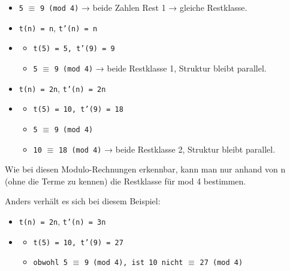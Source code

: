 \documentclass{article}
\begin{document}
      \begin{itemize}
        \item \texttt{5} $\equiv$ \texttt{9 (mod 4)} → beide Zahlen Rest 1 → gleiche Restklasse.

        \item \texttt{t(n) = n}, \texttt{t'(n) = n}

        \item 
          \begin{itemize}
            \item \texttt{t(5) = 5, t'(9) = 9}

            \item \texttt{5} $\equiv$ \texttt{9 (mod 4)} → beide Restklasse 1, Struktur bleibt parallel.

          \end{itemize}
        

        \item \texttt{t(n) = 2n}, \texttt{t'(n) = 2n}

        \item 
          \begin{itemize}
            \item \texttt{t(5) = 10, t'(9) = 18}

            \item \texttt{5} $\equiv$ \texttt{9 (mod 4)}

            \item \texttt{10} $\equiv$ \texttt{18 (mod 4)} → beide Restklasse 2, Struktur bleibt parallel.

          \end{itemize}
        

      \end{itemize}

      
Wie bei diesen Modulo-Rechnungen erkennbar, kann man nur anhand von n (ohne die Terme zu kennen) die Restklasse für mod 4 bestimmen.


      
Anders verhält es sich bei diesem Beispiel:


      \begin{itemize}
        \item \texttt{t(n) = 2n}, \texttt{t'(n) = 3n}

        \item 
          \begin{itemize}
            \item \texttt{t(5) = 10, t'(9) = 27}

            \item \texttt{obwohl 5} $\equiv$ \texttt{9 (mod 4), ist 10 nicht} $\equiv$ \texttt{27 (mod 4)}

          \end{itemize}
        

      \end{itemize}
\end{document}
